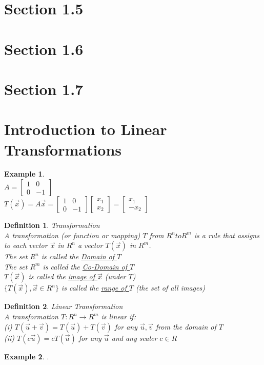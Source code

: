 \documentclass[a4paper,12pt]{book}
\theoremstyle{defn}
\newtheorem{defn}{Definition}[section]
\theoremstyle{expl}
\newtheorem{expl}{Example}[section]
\begin{document}
\section{Section 1.5}
\section{Section 1.6}
\section{Section 1.7}
\section{Introduction to Linear Transformations}
\begin{expl}\-\\
\textup{
$A = \left[\begin{array}{cc}1&0\\0&-1\end{array}\right]$\\
$T(\vec{x})=A\vec{x}=\left[\begin{array}{cc}1&0\\0&-1\end{array}\right]\left[\begin{array}{c}x_1\\x_2\end{array}\right]=\left[\begin{array}{c}x_1\\-x_2\end{array}\right]$\\
}\end{expl}
\begin{defn}
\textup{
Transformation\\
A transformation (or function or mapping) $T$ from $R^n to R^m$ is a rule that assigns to each vector $\vec{x}$ in $R^n$ a vector $T(\vec{x})$ in $R^m$.\\
The set $R^n$ is called the \underline{Domain of $T$}\\
The set $R^m$ is called the \underline{Co-Domain of $T$}\\
$T(\vec{x})$ is called the \underline{image of $\vec{x}$} (under $T$)\\
$\{T(\vec{x}),\vec{x}\in R^n\}$ is called the \underline{range of $T$} (the set of all images)\\
}\end{defn}

\begin{defn}
\textup{
Linear Transformation\\
A transformation $T: R^n \rightarrow R^m$ is linear if:\\
(i) $T(\vec{u}+\vec{v})=T(\vec{u})+T(\vec{v})$ for any $\vec{u},\vec{v}$ from the domain of $T$\\
(ii) $T(c\vec{u})=cT(\vec{u})$ for any $\vec{u}$ and any scaler $c\in R$\\
}\end{defn}
\begin{expl} 
\textup{
.
}\end{expl}
\end{document}
